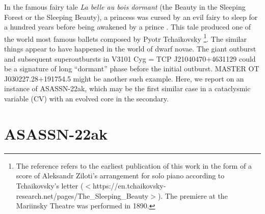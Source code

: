 \documentclass{article}
\begin{document}
   In the famous fairy tale \textit{La belle au bois dormant}
(the Beauty in the Sleeping Forest or the Sleeping Beauty),
a princess was cursed by an evil fairy to sleep for a hundred years
before being awakened by a prince \citep{per1697sleepingbeauty}.
This tale produced one of the world most famous ballets composed
by Pyotr Tchaikovsky \citep{tch1889sleepingbeauty}\footnote{
   The reference refers to the earliest publication of this work
   in the form of a score of Aleksandr Ziloti's arrangement for
   solo piano according to Tchaikovsky's letter
($<$https://en.tchaikovsky-research.net/pages/The\_Sleeping\_Beauty$>$).
   The premiere at the Mariinsky Theatre was performed in 1890.
}.  The similar things appear to have happened in the world
of dwarf novae.  The giant outburst and subsequent superoutbursts
in V3101 Cyg = TCP J21040470$+$4631129
\citep{tam20v3101cyg,ham21DNrebv3101cyg} could be a signature
of long ``dormant'' phase before the initial outburst.
MASTER OT J030227.28$+$191754.5 \citep{tam23j0302,kim23j0302}
might be another such example.  Here, we report on an instance
of ASASSN-22ak, which may be the first similar case in
a cataclysmic variable (CV) with an evolved core in the secondary.

\section{ASASSN-22ak}
\end{document}
